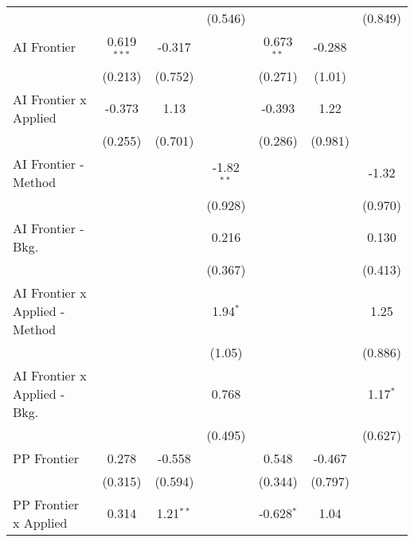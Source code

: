 \begin{tabular}{lcccccc}
                                  &               &                & (0.546)       &               &               & (0.849)\\   
   AI Frontier                    & 0.619$^{***}$ & -0.317         &               & 0.673$^{**}$  & -0.288        &   \\   
                                  & (0.213)       & (0.752)        &               & (0.271)       & (1.01)        &   \\   
   AI Frontier x Applied          & -0.373        & 1.13           &               & -0.393        & 1.22          &   \\   
                                  & (0.255)       & (0.701)        &               & (0.286)       & (0.981)       &   \\   
   AI Frontier - Method           &               &                & -1.82$^{**}$  &               &               & -1.32\\   
                                  &               &                & (0.928)       &               &               & (0.970)\\   
   AI Frontier - Bkg.             &               &                & 0.216         &               &               & 0.130\\   
                                  &               &                & (0.367)       &               &               & (0.413)\\   
   AI Frontier x Applied - Method &               &                & 1.94$^{*}$    &               &               & 1.25\\   
                                  &               &                & (1.05)        &               &               & (0.886)\\   
   AI Frontier x Applied - Bkg.   &               &                & 0.768         &               &               & 1.17$^{*}$\\   
                                  &               &                & (0.495)       &               &               & (0.627)\\   
   PP Frontier                    & 0.278         & -0.558         &               & 0.548         & -0.467        &   \\   
                                  & (0.315)       & (0.594)        &               & (0.344)       & (0.797)       &   \\   
   PP Frontier x Applied          & 0.314         & 1.21$^{**}$    &               & -0.628$^{*}$  & 1.04          &   \\   

\end{tabular}
